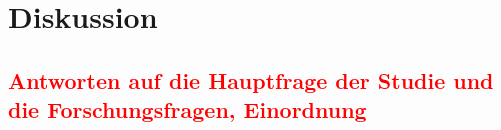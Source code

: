 
\chapter{Diskussion}
\label{chap:diskussion}

\section[Antworten auf die Hauptfrage der Studie und die Forschungsfragen, Einordnung]{\textcolor{red}{Antworten auf die Hauptfrage der Studie und die Forschungsfragen, Einordnung}}%
\label{sec:antworten}


